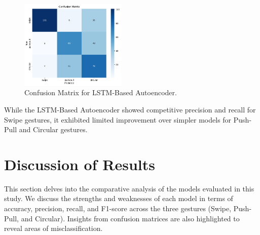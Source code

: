 \documentclass[10pt,twocolumn,letterpaper]{article}
\begin{document}
\begin{table}[h]
\small
\begin{center}
\caption{Performance Metrics for LSTM-Based Autoencoder}
\vspace{0.1cm}
\end{center}
\end{table}

\begin{figure}[h]
  \centering
  \includegraphics[width=0.45\textwidth]{figures/confusion_matrix_lstm_autoencoder.png}
  \caption{Confusion Matrix for LSTM-Based Autoencoder.}
  \label{fig:confusion_matrix_lstm_autoencoder}
\end{figure}

While the LSTM-Based Autoencoder showed competitive precision and recall for Swipe gestures, it exhibited limited improvement over simpler models for Push-Pull and Circular gestures.



\section{Discussion of Results}

This section delves into the comparative analysis of the models evaluated in this study. We discuss the strengths and weaknesses of each model in terms of accuracy, precision, recall, and F1-score across the three gestures (Swipe, Push-Pull, and Circular). Insights from confusion matrices are also highlighted to reveal areas of misclassification.
\end{document}

